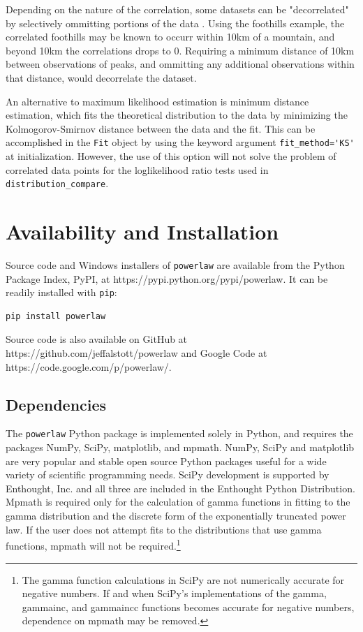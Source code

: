\documentclass[10pt]{article}
\begin{document}
Depending on the nature of the correlation, some datasets can be "decorrelated" by selectively ommitting portions of the data \cite{Klaus2011}. Using the foothills example, the correlated foothills may be known to occurr within 10km of a mountain, and beyond 10km the correlations drops to 0. Requiring a minimum distance of 10km between observations of peaks, and ommitting any additional observations within that distance, would decorrelate the dataset. 

An alternative to maximum likelihood estimation is minimum distance estimation, which fits the theoretical distribution to the data by minimizing the Kolmogorov-Smirnov distance between the data and the fit. This can be accomplished in the \verb$Fit$ object by using the keyword argument \verb$fit_method='KS'$ at initialization. However, the use of this option will not solve the problem of correlated data points for the loglikelihood ratio tests used in \verb$distribution_compare$.

\section*{Availability and Installation}
Source code and Windows installers of \verb$powerlaw$ are available from the Python Package Index, PyPI, at https://pypi.python.org/pypi/powerlaw. It can be readily installed with \verb$pip$:

\begin{verbatim}
pip install powerlaw
\end{verbatim}

Source code is also available on GitHub at https://github.com/jeffalstott/powerlaw and Google Code at https://code.google.com/p/powerlaw/.

\subsection*{Dependencies}
The \verb$powerlaw$ Python package is implemented solely in Python, and requires the packages NumPy, SciPy, matplotlib, and mpmath. NumPy, SciPy and matplotlib are very popular and stable open source Python packages useful for a wide variety of scientific programming needs. SciPy development is supported by Enthought, Inc. and all three are included in the Enthought Python Distribution. Mpmath is required only for the calculation of gamma functions in fitting to the gamma distribution and the discrete form of the exponentially truncated power law. If the user does not attempt fits to the distributions that use gamma functions, mpmath will not be required.\footnote{The gamma function calculations in SciPy are not numerically accurate for negative numbers. If and when SciPy's implementations of the gamma, gammainc, and gammaincc functions becomes accurate for negative numbers, dependence on mpmath may be removed.}
\end{document}
